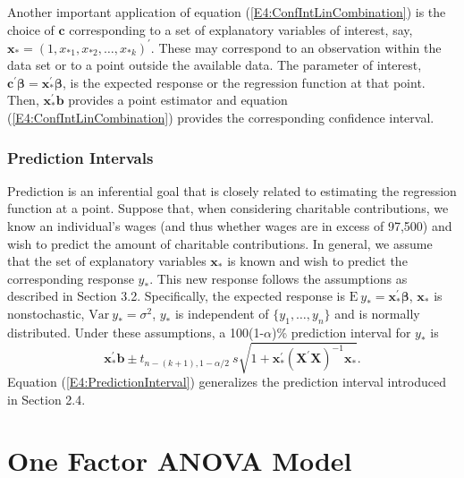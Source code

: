 Another important application of equation
(\ref{E4:ConfIntLinCombination}) is the choice of $\mathbf{c}$
corresponding to a set of explanatory variables of interest, say,
$\mathbf{x}_{\ast}=\left( 1,x_{\ast 1},x_{\ast 2},\ldots,x_{\ast k}
\right)^{\prime}$. These may correspond to an observation within the
data set or to a point outside the available data. The parameter of
interest, $\mathbf{c}^{\prime} \boldsymbol \beta =
\mathbf{x}_{\ast}^{\prime} \boldsymbol \beta $, is the expected
response or the regression function at that point. Then,
$\mathbf{x}_{\ast}^{\prime} \mathbf{b}$ provides a point estimator
and equation (\ref{E4:ConfIntLinCombination}) provides the
corresponding confidence interval.

\subsubsection*{Prediction Intervals}

Prediction is an inferential goal that is closely related to
estimating the regression function at a point. Suppose that, when
considering charitable contributions, we know an individual's wages
(and thus whether wages are in excess of 97,500) and wish to predict
the amount of charitable contributions. In general, we assume that
the set of explanatory variables $\mathbf{x}_{\ast}$ is known and
wish to predict the corresponding response $y_{\ast}$. This new
response follows the assumptions as described in Section 3.2.
Specifically, the expected response is $\mathrm{E~}y_{\ast}=
\mathbf{x}_{\ast}^{\prime} \boldsymbol \beta $, $\mathbf{x}_{\ast}$
is nonstochastic, $\mathrm{Var~}y_{\ast}=\sigma^2$, $y_{\ast}$ is
independent of $\{y_1,\ldots,y_{n}\}$ and is normally distributed.
Under these assumptions, a 100(1-$\alpha $)\% prediction interval
for $y_{\ast}$ is
\begin{equation}\label{E4:PredictionInterval}
\mathbf{x}_{\ast}^{\prime} \mathbf{b} \pm t_{n-(k+1),1-\alpha /2} ~s
\sqrt{1 + \mathbf{x}_{\ast}^{\prime} ( \mathbf{X}^{\prime}\mathbf{X}
)^{-1} \mathbf{x}_{\ast}}.
\end{equation}
Equation (\ref{E4:PredictionInterval}) generalizes the prediction
interval introduced in Section 2.4.


\section{One Factor ANOVA Model}\label{S4:OneFactor}

